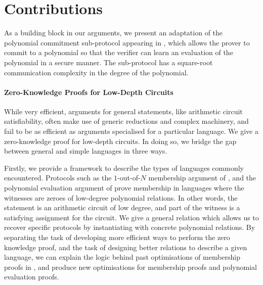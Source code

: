 \section{Contributions}

As a building block in our arguments, we present an adaptation of the polynomial commitment sub-protocol appearing in \cite{BootleG18}, which allows the prover to commit to a polynomial so that the verifier can learn an evaluation of the polynomial in a secure manner. The sub-protocol has a square-root communication complexity in the degree of the polynomial.

\paragraph{Zero-Knowledge Proofs for Low-Depth Circuits} While very efficient, arguments for general statements, like arithmetic circuit satisfiability, often make use of generic reductions and complex machinery, and fail to be as efficient as arguments specialised for a particular language. We give a zero-knowledge proof for low-depth circuits. In doing so, we bridge the gap between general and simple languages in three ways.

Firstly, we provide a framework to describe the types of languages commonly encountered. Protocols such as the $1$-out-of-$N$ membership argument of  \cite{GrothK15}, and the polynomial evaluation argument of \cite{BayerG13} prove membership in languages where the witnesses are zeroes of low-degree polynomial relations. In other words, the statement is an arithmetic circuit of low degree, and part of the witness is a satisfying assignment for the circuit. We give a general relation which allows us to recover specific protocols by instantiating with concrete polynomial relations. By separating the task of developing more efficient ways to perform the zero knowledge proof, and the task of designing better relations to describe a given language, we can explain the logic behind past optimisations of membership proofs in \cite{GrothK15,BootleG18}, and produce new optimisations for membership proofs and polynomial evaluation proofs.

